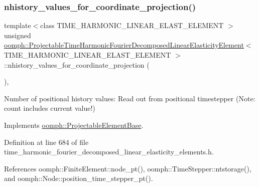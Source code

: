\subsubsection{\texorpdfstring{nhistory\+\_\+values\+\_\+for\+\_\+coordinate\+\_\+projection()}{nhistory\_values\_for\_coordinate\_projection()}}
{\footnotesize\ttfamily template$<$class T\+I\+M\+E\+\_\+\+H\+A\+R\+M\+O\+N\+I\+C\+\_\+\+L\+I\+N\+E\+A\+R\+\_\+\+E\+L\+A\+S\+T\+\_\+\+E\+L\+E\+M\+E\+NT $>$ \\
unsigned \hyperlink{classoomph_1_1ProjectableTimeHarmonicFourierDecomposedLinearElasticityElement}{oomph\+::\+Projectable\+Time\+Harmonic\+Fourier\+Decomposed\+Linear\+Elasticity\+Element}$<$ T\+I\+M\+E\+\_\+\+H\+A\+R\+M\+O\+N\+I\+C\+\_\+\+L\+I\+N\+E\+A\+R\+\_\+\+E\+L\+A\+S\+T\+\_\+\+E\+L\+E\+M\+E\+NT $>$\+::nhistory\+\_\+values\+\_\+for\+\_\+coordinate\+\_\+projection (\begin{DoxyParamCaption}{ }\end{DoxyParamCaption})\hspace{0.3cm}{\ttfamily [inline]}, {\ttfamily [virtual]}}



Number of positional history values\+: Read out from positional timestepper (Note\+: count includes current value!) 



Implements \hyperlink{classoomph_1_1ProjectableElementBase_ab4ecd0cd24000a3ed675dc7198203c1f}{oomph\+::\+Projectable\+Element\+Base}.



Definition at line 684 of file time\+\_\+harmonic\+\_\+fourier\+\_\+decomposed\+\_\+linear\+\_\+elasticity\+\_\+elements.\+h.



References oomph\+::\+Finite\+Element\+::node\+\_\+pt(), oomph\+::\+Time\+Stepper\+::ntstorage(), and oomph\+::\+Node\+::position\+\_\+time\+\_\+stepper\+\_\+pt().

\mbox{\label{classoomph_1_1ProjectableTimeHarmonicFourierDecomposedLinearElasticityElement_a6ab68c3941f90a662a1b696bc7d4b3d7}} 
